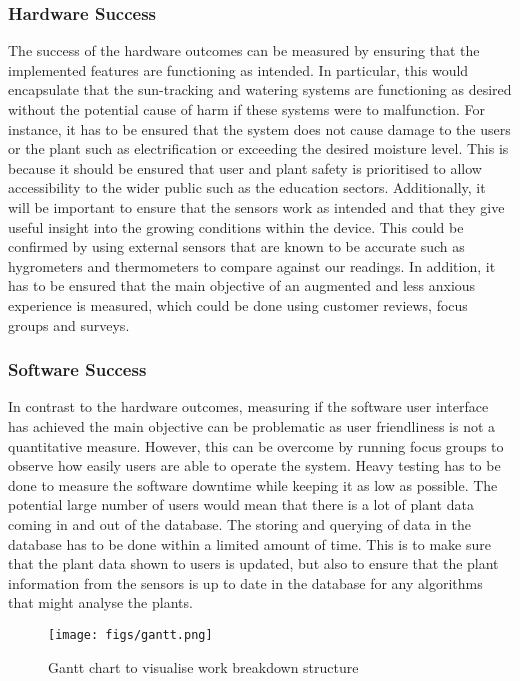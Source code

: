 \documentclass{article}
\begin{document}
\subsubsection{Hardware Success}
The success of the hardware outcomes can be measured by ensuring that the implemented features are functioning as intended. In particular, this would encapsulate that the sun-tracking and watering systems are functioning as desired without the potential cause of harm if these systems were to malfunction. For instance, it has to be ensured that the system does not cause damage to the users or the plant such as electrification or exceeding the desired moisture level. This is because it should be ensured that user and plant safety is prioritised to allow accessibility to the wider public such as the education sectors. Additionally, it will be important to ensure that the sensors work as intended and that they give useful insight into the growing conditions within the device. This could be confirmed by using external sensors that are known to be accurate such as hygrometers and thermometers to compare against our readings. In addition, it has to be ensured that the main objective of an augmented and less anxious experience is measured, which could be done using customer reviews, focus groups and surveys.


\subsubsection{Software Success}
In contrast to the hardware outcomes, measuring if the software user interface has achieved the main objective can be problematic as user friendliness is not a quantitative measure. However, this can be overcome by running focus groups to observe how easily users are able to operate the system. Heavy testing has to be done to measure the software downtime while keeping it as low as possible. The potential large number of users would mean that there is a lot of plant data coming in and out of the database. The storing and querying of data in the database has to be done within a limited amount of time. This is to make sure that the plant data shown to users is updated, but also to ensure that the plant information from the sensors is up to date in the database for any algorithms that might analyse the plants. 


\begin{sidewaysfigure*}[ht]
    \texttt{[image: figs/gantt.png]}
    \caption{Gantt chart to visualise work breakdown structure}
    \label{fig:gantt}
\end{sidewaysfigure*}
\end{document}
